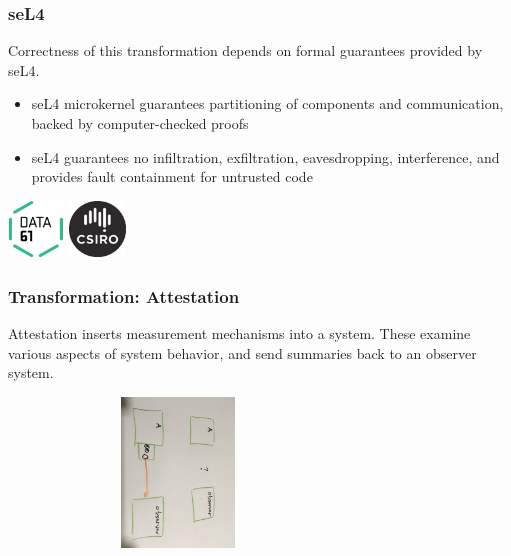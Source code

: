 \documentclass{beamer}
\begin{document}
\begin{frame}\frametitle{seL4}



Correctness of this transformation depends on formal guarantees provided by seL4.

\begin{itemize}
\item seL4 microkernel guarantees partitioning of components and
  communication, backed by computer-checked proofs

\item seL4 guarantees no infiltration, exfiltration, eavesdropping,
  interference, and provides fault containment for untrusted code

\end{itemize}

\vspace*{5mm}
\hspace*{10mm}\includegraphics[width=15mm,height=15mm]{data61-logo.png}
\hspace*{10mm}\includegraphics[width=15mm,height=15mm]{csiro--black.png}

\end{frame}

\begin{frame}\frametitle{Transformation: Attestation}

Attestation inserts measurement mechanisms into a system. These
examine various aspects of system behavior, and send summaries back to
an observer system.

\hspace*{10mm}\includegraphics[width=90mm,height=40mm]{att.jpg}

\end{frame}
\end{document}

